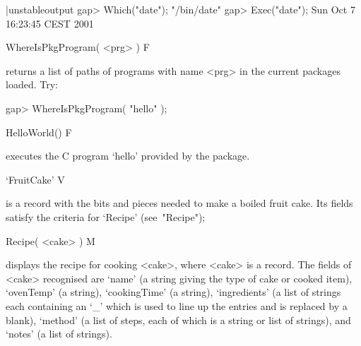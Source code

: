 \beginexample|unstableoutput
gap> Which("date");         
"/bin/date"
gap> Exec("date");
Sun Oct  7 16:23:45 CEST 2001
\endexample

\>WhereIsPkgProgram( <prg> ) F

returns a list of paths of  programs  with  name  <prg>  in  the  current
packages loaded. Try:

\beginexample
gap> WhereIsPkgProgram( "hello" );
\endexample

\>HelloWorld() F

executes the C program `hello' provided by the {\Example} package.

\>`FruitCake' V

is a record with the bits and pieces needed to make a boiled fruit  cake.
Its fields satisfy the criteria for `Recipe' (see~"Recipe");

\>Recipe( <cake> ) M

displays the recipe for cooking <cake>, where <cake>  is  a  record.  The
fields of <cake> recognised are `name' (a string giving the type of  cake
or  cooked  item),  `ovenTemp'  (a  string),  `cookingTime'  (a  string),
`ingredients' (a list of strings each containing an `_' which is used  to
line up the entries and is replaced by a  blank),  `method'  (a  list  of
steps, each of which is a string or list of strings), and `notes' (a list
of strings).



